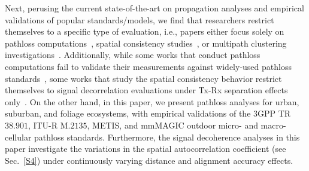 \documentclass[12pt, draftcls, onecolumn]{IEEEtran}
\begin{document}
Next, perusing the current state-of-the-art on propagation analyses and empirical validations of popular standards/models, we find that researchers restrict themselves to a specific type of evaluation, i.e., papers either focus solely on pathloss computations~\cite{Qualcomm3GPP, MacCartneyModelsOverview, FoliageSimulations, SuburbanGeometryJournal}, spatial consistency studies~\cite{SpatialConsistencyOriginal}, or multipath clustering investigations~\cite{QDC_NIST, D2DHumanBlockage}. Additionally, while some works that conduct pathloss computations fail to validate their measurements against widely-used pathloss standards~\cite{FoliageSimulations, SuburbanGeometryJournal}, some works that study the spatial consistency behavior restrict themselves to signal decorrelation evaluations under Tx-Rx separation effects only~\cite{SpatialConsistencyOriginal, MacCartneyRural, SpatialDynamics}. On the other hand, in this paper, we present pathloss analyses for urban, suburban, and foliage ecosystems, with empirical validations of the $3$GPP TR$38.901$, ITU-R M$.2135$, METIS, and mmMAGIC outdoor micro- and macro-cellular pathloss standards. Furthermore, the signal decoherence analyses in this paper investigate the variations in the spatial autocorrelation coefficient (see Sec.~\ref{S4}) under continuously varying distance and alignment accuracy effects.
\end{document}
